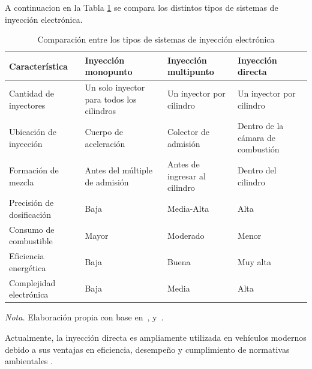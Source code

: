 A continuacion en la Tabla \ref{tab:INye} se compara los distintos tipos de sistemas de inyección electrónica.

\begin{table}[h]
	\centering
	\captionsetup{labelformat=simple, labelsep=newline, textfont=it, labelfont=bf}
	\caption{Comparación entre los tipos de sistemas de inyección electrónica}
	\label{tab:INye}
	\vspace{0.3cm}
	
	\begin{tabularx}{\linewidth}{p{3.8cm} X X X}
		\toprule %
		\rowcolor[rgb]{0.851, 0.851, 0.851}
		\textbf{Característica} & \textbf{Inyección monopunto} & \textbf{Inyección multipunto} & \textbf{Inyección directa} \\
		\midrule %
		Cantidad de inyectores & Un solo inyector para todos los cilindros & Un inyector por cilindro & Un inyector por cilindro \\
		\addlinespace
		Ubicación de inyección & Cuerpo de aceleración & Colector de admisión & Dentro de la cámara de combustión \\
		\addlinespace
		Formación de mezcla & Antes del múltiple de admisión & Antes de ingresar al cilindro & Dentro del cilindro \\
		\addlinespace
		Precisión de dosificación & Baja & Media-Alta & Alta \\
		\addlinespace
		Consumo de combustible & Mayor & Moderado & Menor \\
		\addlinespace
		Eficiencia energética & Baja & Buena & Muy alta \\
		\addlinespace
		Complejidad electrónica & Baja & Media & Alta \\
		\bottomrule %
	\end{tabularx}
	\vspace{0.2cm}
	
	\begin{flushleft}
		\footnotesize \textit{Nota.} Elaboración propia con base en~\citep{Motorpasion_Inyeccion}, \citep{Bosch_Automotive} y~\citep{Bosch_GDI}.
	\end{flushleft}
\end{table}

Actualmente, la inyección directa es ampliamente utilizada en vehículos modernos debido a sus ventajas en eficiencia, desempeño y cumplimiento de normativas ambientales \citep{Bosch_GDI, web_inyeccion3}.



